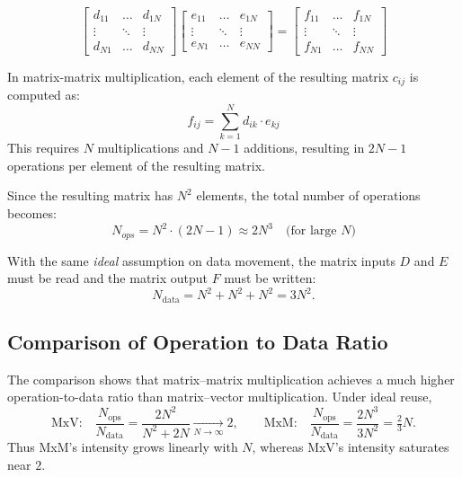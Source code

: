 \begin{equation}
	\begin{bmatrix}
		d_{11} & \hdots & d_{1N} \\ 
		\vdots & \ddots & \vdots \\ 
		d_{N1} & \hdots & d_{NN}
	\end{bmatrix}
	\begin{bmatrix}
		e_{11} & \hdots & e_{1N} \\ 
		\vdots & \ddots & \vdots \\ 
		e_{N1} & \hdots & e_{NN}
	\end{bmatrix}
	=
	\begin{bmatrix}
		f_{11} & \hdots & f_{1N} \\ 
		\vdots & \ddots & \vdots \\ 
		f_{N1} & \hdots & f_{NN}
	\end{bmatrix}
\end{equation}

\vspace{0.25cm}

In matrix-matrix multiplication, each element of the resulting matrix \(c_{ij}\) is computed as:
\begin{equation}
f_{ij} = \sum_{k=1}^{N} d_{ik} \cdot e_{kj}
\end{equation}
This requires \(N\) multiplications and \(N-1\) additions, resulting in \(2N-1\) operations per element of the resulting matrix.

Since the resulting matrix has \(N^2\) elements, the total number of operations becomes:
\begin{equation}
N_{ops} = N^2 \cdot (2N-1) \approx 2N^3 \quad \text{(for large \(N\))}
\end{equation}

With the same \emph{ideal} assumption on data movement, the matrix inputs \(D\) and \(E\) must be read and the matrix output \(F\) must be written:
\begin{equation}
N_{\text{data}} = N^2 + N^2 + N^2 = 3N^2.
\end{equation}


\subsection{Comparison of Operation to Data Ratio}
\label{subsec::operation_data_ratio}

The comparison shows that matrix–matrix multiplication achieves a much higher operation-to-data ratio than matrix–vector multiplication. Under ideal reuse,
\[
\text{MxV:}\quad \frac{N_{\text{ops}}}{N_{\text{data}}}
= \frac{2N^2}{N^2 + 2N} \xrightarrow[N\to\infty]{} 2,
\qquad
\text{MxM:}\quad \frac{N_{\text{ops}}}{N_{\text{data}}}
= \frac{2N^3}{3N^2} = \tfrac{2}{3}N.
\]
Thus MxM’s intensity grows linearly with \(N\), whereas MxV’s intensity saturates near \(2\).

